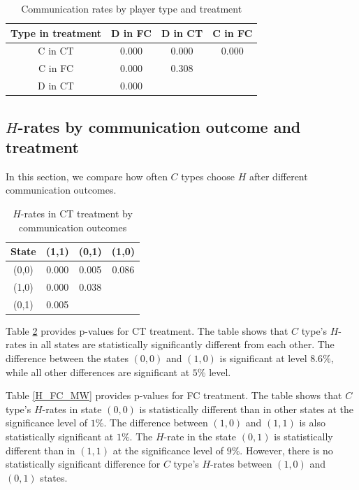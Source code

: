 \documentclass[12pt]{article}
\theoremstyle{break}
\begin{document}
\begin{table}[h!]
\begin{center}
	\begin{tabular}{c | c c c}
			Type in treatment & D in FC & D in CT & C in FC \\
			\hline
			C in CT & 0.000 & 0.000	& 0.000\\
			C in FC & 0.000 & 0.308 & \\ 
			D in CT & 0.000 &  & \\ 
	\end{tabular}
	\end{center}
	\caption{Communication rates by player type and treatment}\label{Communication_MW}	
\end{table}

\subsection{$H$-rates by communication outcome and treatment}
In this section, we compare how often $C$ types choose $H$ after different communication outcomes.

\begin{table}[h!]
\begin{center}
	\begin{tabular}{c | c c c}
			State & (1,1) & (0,1) & (1,0) \\
			\hline
			(0,0) & 0.000 & 0.005	& 0.086\\
			(1,0) & 0.000 & 0.038 & \\ 
			(0,1) & 0.005 &  & \\ 
	\end{tabular}
	\end{center}
	\caption{$H$-rates in CT treatment by communication outcomes}	\label{H_CT_MW}
\end{table}

Table \ref{H_CT_MW} provides p-values for CT treatment. The table shows that $C$ type's $H$-rates in all states are statistically significantly different from each other. The difference between the states $(0,0)$ and $(1,0)$ is significant at level $8.6\%$, while all other differences are significant at $5\%$ level.

Table \ref{H_FC_MW} provides p-values for FC treatment. The table shows that $C$ type's $H$-rates in state $(0,0)$ is statistically different than in other states at the significance level of $1\%$. The difference between $(1,0)$ and $(1,1)$ is also statistically significant at $1\%$. The $H$-rate in the state $(0,1)$ is statistically different than in $(1,1)$ at the significance level of $9\%$. However, there is no statistically significant difference for $C$ type's $H$-rates between $(1,0)$ and $(0,1)$ states.
\end{document}

